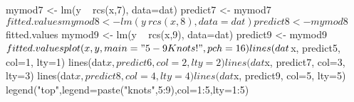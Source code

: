 \begin{Schunk}
\begin{Sinput}
 mymod7 <- lm(y ~ rcs(x,7), data=dat)
 predict7 <- mymod7$fitted.values
 mymod8 <- lm(y ~ rcs(x,8), data=dat)
 predict8 <- mymod8$fitted.values
 mymod9 <- lm(y ~ rcs(x,9), data=dat)
 predict9 <- mymod9$fitted.values
 plot(x,y,main="5- 9 Knots!", pch=16)
 lines(dat$x, predict5, col=1, lty=1)
 lines(dat$x, predict6, col=2, lty=2)
 lines(dat$x, predict7, col=3, lty=3)
 lines(dat$x, predict8, col=4, lty=4)
 lines(dat$x, predict9, col=5, lty=5)
 legend("top",legend=paste("knots",5:9),col=1:5,lty=1:5)
\end{Sinput}
\end{Schunk}

